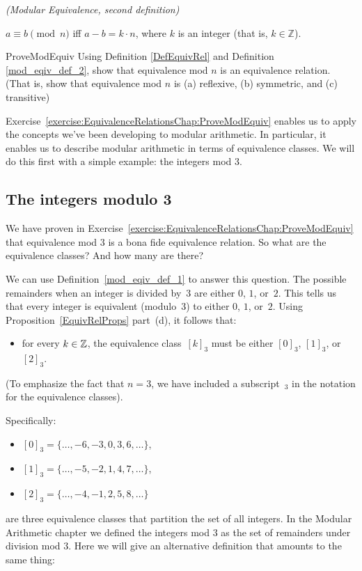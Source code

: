 \begin{defn}\label{mod_eqiv_def_2} \emph{(Modular Equivalence, second definition)}

\medskip
$a \equiv b \pmod{n}$ iff $a - b = k \cdot n$, where $k$ is an integer (that is, $k \in  {\mathbb Z}$). 
\end{defn}

\begin{exercise}{ProveModEquiv}
Using Definition \ref{DefEquivRel} and Definition  \ref{mod_eqiv_def_2}, show that equivalence mod $n$ is an equivalence relation. (That is, show that equivalence mod $n$ is (a) reflexive, (b) symmetric, and (c) transitive)
\end{exercise}

Exercise~\ref{exercise:EquivalenceRelationsChap:ProveModEquiv} enables us to apply the concepts we've been developing to modular arithmetic. In particular, it enables us to describe modular arithmetic in terms of equivalence classes. We will do this first with a simple example: the integers mod 3.

\subsection{The integers modulo 3}

We have proven in Exercise~\ref{exercise:EquivalenceRelationsChap:ProveModEquiv} that equivalence mod 3 is a bona fide equivalence relation. So what are the equivalence classes? And how many are there?
\medskip

We can use Definition~\ref{mod_eqiv_def_1} to answer this question. The possible remainders when an integer is divided by~$3$ are either $0$, $1$, or~$2$. This tells us that  every integer is equivalent (modulo~$3$) to either $0$, $1$, or~$2$. Using Proposition~\ref{EquivRelProps} part~(d), it follows that:
\begin{itemize}
\item[] for every $k \in \mathbb{Z}$, the equivalence class~$[k]_3$ must be either $[0]_3$, $[1]_3$, or~$[2]_3$.
\end{itemize}
(To emphasize the fact that $n = 3$, we have included a subscript~${}_3$ in the notation for the equivalence classes).

\noindent
Specifically:
\begin{itemize}
\item[]
$[0]_3 = \{ \ldots, -6, -3, 0, 3, 6, \ldots \}$,
\item[]
$[1]_3 = \{ \ldots, -5, -2, 1, 4, 7, \ldots \}$,
\item[]
$[2]_3 = \{ \ldots, -4, -1, 2, 5, 8, \ldots \}$
\end{itemize}
are three equivalence classes that partition the set of all  integers.
In the Modular Arithmetic chapter we defined the integers mod 3 as the set of remainders under division mod 3. Here we will give an alternative definition that amounts to the same thing:

